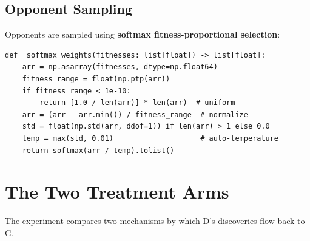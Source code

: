 \documentclass[11pt,a4paper]{article}
\begin{document}
\subsection{Opponent Sampling}

Opponents are sampled using \textbf{softmax fitness-proportional selection}:

\begin{lstlisting}[caption={Softmax sampling (\texttt{opponent\_provider.py:23--41})}]
def _softmax_weights(fitnesses: list[float]) -> list[float]:
    arr = np.asarray(fitnesses, dtype=np.float64)
    fitness_range = float(np.ptp(arr))
    if fitness_range < 1e-10:
        return [1.0 / len(arr)] * len(arr)  # uniform
    arr = (arr - arr.min()) / fitness_range  # normalize
    std = float(np.std(arr, ddof=1)) if len(arr) > 1 else 0.0
    temp = max(std, 0.01)                    # auto-temperature
    return softmax(arr / temp).tolist()
\end{lstlisting}

\section{The Two Treatment Arms}

The experiment compares two mechanisms by which D's discoveries flow back to G.
\end{document}

